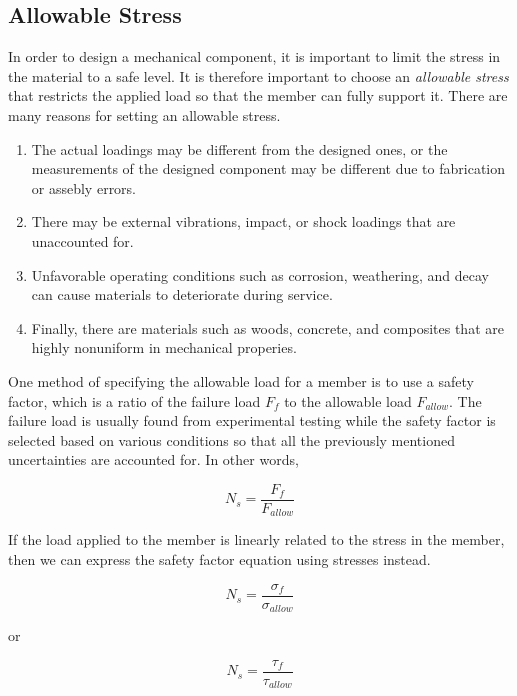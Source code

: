 \documentclass[
10pt,
a4paper,
openany,
svgnames,
]{kaobook} %
\begin{document}
\subsection{Allowable Stress}

In order to design a mechanical component, it is important to limit the stress in the material to a safe level. It is therefore important to choose an \emph{allowable stress} that restricts the applied load so that the member can fully support it. There are many reasons for setting an allowable stress.

\begin{enumerate}
  \item The actual loadings may be different from the designed ones, or the measurements of the designed component may be different due to fabrication or assebly errors.
  \item There may be external vibrations, impact, or shock loadings that are unaccounted for.
  \item Unfavorable operating conditions such as corrosion, weathering, and decay can cause materials to deteriorate during service.
  \item Finally, there are materials such as woods, concrete, and composites that are highly nonuniform in mechanical properies.
\end{enumerate}

One method of specifying the allowable load for a member is to use a safety factor, which is a ratio of the failure load $F_{f}$ to the allowable load $F_{allow}$. The failure load is usually found from experimental testing while the safety factor is selected based on various conditions so that all the previously mentioned uncertainties are accounted for. In other words,

\begin{equation}
  \label{eq:1}
  N_{s} = \frac{F_{f}}{F_{allow}}
\end{equation}

If the load applied to the member is linearly related to the stress in the member, then we can express the safety factor equation using stresses instead.

\begin{equation}
  \label{eq:2}
  N_{s} = \frac{\sigma_{f}}{\sigma_{allow}}
\end{equation}

or

\begin{equation}
  \label{eq:3}
  N_{s} = \frac{\tau_{f}}{\tau_{allow}}
\end{equation}
\end{document}
